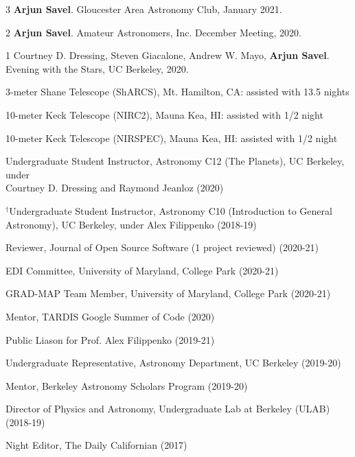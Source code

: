 \documentclass[12pt,letterpaper]{article}
\begin{document}
\begin{list}{}{\cvlist}
\item[{\color{numcolor}\scriptsize3}] \textbf{Arjun Savel}. Gloucester Area Astronomy Club, January 2021.
\item[{\color{numcolor}\scriptsize2}] \textbf{Arjun Savel}. Amateur Astronomers, Inc. December Meeting, 2020.
\item[{\color{numcolor}\scriptsize1}] Courtney D. Dressing, Steven Giacalone, Andrew W. Mayo, \textbf{Arjun Savel}. Evening with the Stars, UC Berkeley, 2020.
\end{list}



\begin{list}{}{\cvlist}

\item 3-meter Shane Telescope (ShARCS), Mt. Hamilton, CA: assisted with 13.5 nights
\item 10-meter Keck Telescope (NIRC2), Mauna Kea, HI: assisted with 1/2 night
\item 10-meter Keck Telescope (NIRSPEC), Mauna Kea, HI: assisted with 1/2 night

\end{list}


\begin{list}{}{\cvlist}
\item Undergraduate Student Instructor, Astronomy C12 (The Planets), UC Berkeley, under \\ Courtney D. Dressing and Raymond Jeanloz (2020)
\item $^\dagger$Undergraduate Student Instructor, Astronomy C10 (Introduction to General \\ Astronomy), UC Berkeley, under Alex Filippenko (2018-19)
\end{list}

\begin{list}{}{\cvlist}
\item Reviewer, Journal of Open Source Software (1 project reviewed) (2020-21)
\item EDI Committee, University of Maryland, College Park (2020-21)
\item GRAD-MAP Team Member, University of Maryland, College Park (2020-21)
\item Mentor, TARDIS Google Summer of Code (2020)
\item Public Liason for Prof. Alex Filippenko (2019-21)
\item Undergraduate Representative, Astronomy Department, UC Berkeley (2019-20)
\item Mentor, Berkeley Astronomy Scholars Program (2019-20)
\item Director of Physics and Astronomy, Undergraduate Lab at Berkeley (ULAB) (2018-19)
\item Night Editor, The Daily Californian (2017)
\end{list}
\end{document}
